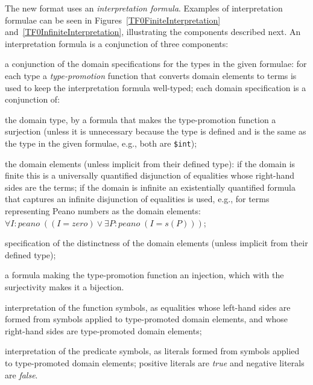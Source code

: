 \documentclass{easychair}
\newcommand{\smalltt}[1]{\small \texttt{#1}}
\newenvironment{packed_itemize}{
\vspace*{-0.2em}
\begin{itemize}
\setlength{\partopsep}{0pt}
\setlength{\itemsep}{1pt}
\setlength{\parskip}{0pt}
\setlength{\parsep}{0pt}
}{\end{itemize}}
\begin{document}
The new format uses an {\em interpretation formula}. 
Examples of interpretation formulae can be seen in Figures~\ref{TF0FiniteInterpretation}
and~\ref{TF0InfiniteInterpretation}, illustrating the components described next. 
An interpretation formula is a conjunction of three components:
\begin{packed_itemize}
\item a conjunction of the domain specifications for the types in the given formulae:
      for each type a {\em type-promotion} function that converts domain elements to terms is
      used to keep the interpretation formula well-typed; each domain specification is a 
      conjunction of:
      \begin{packed_itemize}
      \item the domain type, by a formula that makes the type-promotion function a surjection 
            (unless it is unnecessary because the type is defined and is the same as the type in 
            the given formulae, e.g., both are {\smalltt{\$int}});
      \item the domain elements (unless implicit from their defined type): if the domain is
            finite this is a universally quantified disjunction of equalities whose right-hand 
            sides are the terms; if the domain is infinite an existentially quantified formula 
            that captures an infinite disjunction of equalities is used, e.g., for terms 
            representing Peano numbers as the domain elements:\\
            \hspace*{0.5cm}$\forall I{:}peano\;((I = zero) \vee \exists P{:}peano\;(I = s(P)))$;
      \item specification of the distinctness of the domain elements (unless implicit from their
            defined type);
      \item a formula making the type-promotion function an injection,
            which with the surjectivity makes it a bijection.
      \end{packed_itemize}
\item interpretation of the function symbols, as equalities whose left-hand sides are 
      formed from symbols applied to type-promoted domain elements, and whose right-hand sides 
      are type-promoted domain elements;
\item interpretation of the predicate symbols, as literals formed from symbols applied
      to type-promoted domain elements; positive literals are {\em true} and negative literals 
      are {\em false}.
\end{packed_itemize}
\end{document}
